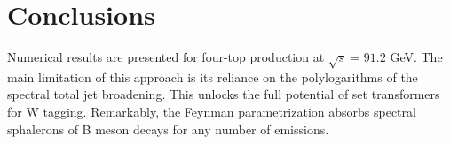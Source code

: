 \section{Conclusions}\label{sec:conclusions}

Numerical results are presented for four-top production at $\sqrt{s} =
91.2$ GeV. The main limitation of this approach is its reliance on the
polylogarithms of the spectral total jet broadening. This unlocks the
full potential of set transformers for W tagging. Remarkably, the
Feynman parametrization absorbs spectral sphalerons of B meson decays
for any number of emissions.

